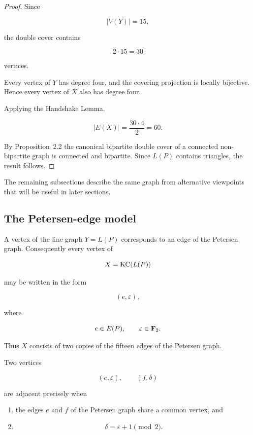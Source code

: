 \begin{proof}

Since

\[
|V(Y)|=15,
\]

the double cover contains

\[
2\cdot15=30
\]

vertices.

Every vertex of \(Y\) has degree four, and the covering projection is
locally bijective. Hence every vertex of \(X\) also has degree four.

Applying the Handshake Lemma,

\[
|E(X)|
=
\frac{30\cdot4}{2}
=
60.
\]

By Proposition~2.2 the canonical bipartite double cover of a connected
non-bipartite graph is connected and bipartite. Since \(L(P)\) contains
triangles, the result follows.

\end{proof}

The remaining subsections describe the same graph from alternative
viewpoints that will be useful in later sections.


\subsection{The Petersen-edge model}

A vertex of the line graph \(Y=L(P)\) corresponds to an edge of the
Petersen graph. Consequently every vertex of

\[
X=\operatorname{KC}(L(P))
\]

may be written in the form

\[
(e,\varepsilon),
\]

where

\[
e\in E(P),
\qquad
\varepsilon\in\mathbf F_2.
\]

Thus \(X\) consists of two copies of the fifteen edges of the Petersen
graph.

Two vertices

\[
(e,\varepsilon),
\qquad
(f,\delta)
\]

are adjacent precisely when

\begin{enumerate}
\item the edges \(e\) and \(f\) of the Petersen graph share a common
vertex, and

\item

\[
\delta=\varepsilon+1
\pmod2.
\]

\end{enumerate}

